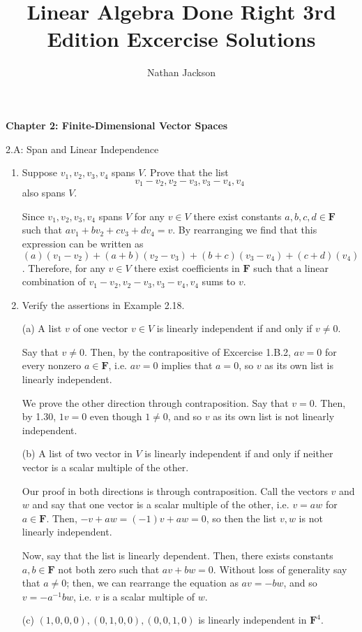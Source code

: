 \documentclass{book}
\title{Linear Algebra Done Right 3rd Edition Excercise Solutions}
\author{Nathan Jackson}
\begin{document}
{\huge \textbf{Chapter 2: Finite-Dimensional Vector Spaces}}

2.A: Span and Linear Independence

\begin{enumerate}

\item Suppose \(v_1,v_2,v_3,v_4\) spans \(V\).  Prove that the list \[v_1-v_2,v_2-v_3,v_3-v_4,v_4\] also spans \(V\).

Since \(v_1,v_2,v_3,v_4\) spans \(V\) for any \(v \in V\) there exist constants \(a,b,c,d \in \textbf{F}\) such that \(av_1+bv_2+cv_3+dv_4=v\).  By rearranging we find that this expression can be written as \((a)(v_1-v_2)+(a+b)(v_2-v_3)+(b+c)(v_3-v_4)+(c+d)(v_4)\).  Therefore, for any \(v \in V\) there exist coefficients in \(\textbf{F}\) such that a linear combination of \(v_1-v_2,v_2-v_3,v_3-v_4,v_4\) sums to \(v\).

\item Verify the assertions in Example 2.18.

(a) A list \(v\) of one vector \(v \in V\) is linearly independent if and only if \(v \neq 0\).

Say that \(v \neq 0\).  Then, by the contrapositive of Excercise 1.B.2, \(av=0\) for every nonzero \(a \in \textbf{F}\), i.e. \(av=0\) implies that \(a=0\), so \(v\) as its own list is linearly independent.

We prove the other direction through contraposition.  Say that \(v=0\).  Then, by 1.30, \(1v=0\) even though \(1 \neq 0\), and so \(v\) as its own list is not linearly independent.

(b) A list of two vector in \(V\) is linearly independent if and only if neither vector is a scalar multiple of the other.

Our proof in both directions is through contraposition.  Call the vectors \(v\) and \(w\) and say that one vector is a scalar multiple of the other, i.e. \(v=aw\) for \(a \in \textbf{F}\).  Then, \(-v+aw=(-1)v+aw=0\), so then the list \(v,w\) is not linearly independent.

Now, say that the list is linearly dependent.  Then, there exists constants \(a,b \in \textbf{F}\) not both zero such that \(av+bw=0\).  Without loss of generality say that \(a \neq 0\); then, we can rearrange the equation as \(av=-bw\), and so \(v=-a^{-1}bw\), i.e. \(v\) is a scalar multiple of \(w\).

(c) \((1,0,0,0),(0,1,0,0),(0,0,1,0)\) is linearly independent in \(\textbf{F}^4\).


\end{enumerate}
\end{document}
